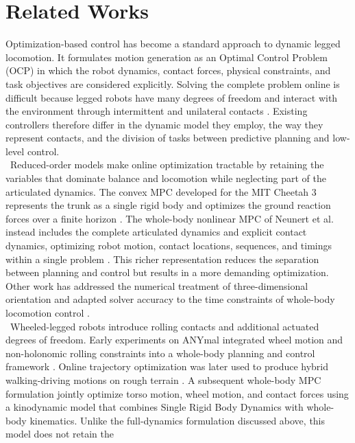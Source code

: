 \section{Related Works}
\label{sec:related_works}

Optimization-based control has become a standard approach to dynamic legged
locomotion. It formulates motion generation as an Optimal Control Problem
(OCP) in which the robot dynamics, contact forces, physical constraints, and task
objectives are considered explicitly. Solving the complete problem online is
difficult because legged robots have many degrees of freedom and interact with
the environment through intermittent and unilateral contacts
\cite{legged_optimization}. Existing controllers therefore differ in the
dynamic model they employ, the way they represent contacts, and the division of
tasks between predictive planning and low-level control.\\
\
Reduced-order models make online optimization tractable by retaining the
variables that dominate balance and locomotion while neglecting part of the
articulated dynamics. The convex MPC developed for the MIT Cheetah 3 represents
the trunk as a single rigid body and optimizes the ground reaction forces over
a finite horizon \cite{cheetah_mpc}. The whole-body nonlinear MPC of Neunert
et al. instead includes the complete articulated dynamics and explicit contact
dynamics, optimizing robot motion,
contact locations, sequences, and timings within a single problem
\cite{whole_body_nmpc}. This richer representation
reduces the separation between planning and control but results in a more
demanding optimization. Other work has addressed the numerical treatment of
three-dimensional orientation \cite{representation_free_mpc} and adapted solver
accuracy to the time constraints of whole-body locomotion control
\cite{fast_whole_body_mpc}.\\
\
Wheeled-legged robots introduce rolling contacts and additional actuated
degrees of freedom. Early experiments on ANYmal integrated wheel motion and
non-holonomic rolling constraints into a whole-body planning and control
framework \cite{keep_rollin}. Online trajectory optimization was later used to
produce hybrid walking-driving motions on rough terrain
\cite{rolling_deep}. A subsequent whole-body MPC formulation jointly optimize
torso motion, wheel motion, and contact forces using a kinodynamic model that
combines Single Rigid Body Dynamics with whole-body kinematics. Unlike the
full-dynamics formulation discussed above, this model does not retain the
